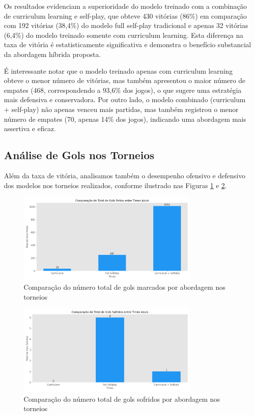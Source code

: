Os resultados evidenciam a superioridade do modelo treinado com a combinação de curriculum learning e self-play, que obteve 430 vitórias (86\%) em comparação com 192 vitórias (38,4\%) do modelo full self-play tradicional e apenas 32 vitórias (6,4\%) do modelo treinado somente com curriculum learning. Esta diferença na taxa de vitória é estatisticamente significativa e demonstra o benefício substancial da abordagem híbrida proposta.

É interessante notar que o modelo treinado apenas com curriculum learning obteve o menor número de vitórias, mas também apresentou o maior número de empates (468, correspondendo a 93,6\% dos jogos), o que sugere uma estratégia mais defensiva e conservadora. Por outro lado, o modelo combinado (curriculum + self-play) não apenas venceu mais partidas, mas também registrou o menor número de empates (70, apenas 14\% dos jogos), indicando uma abordagem mais assertiva e eficaz.

\subsection{Análise de Gols nos Torneios}

Além da taxa de vitória, analisamos também o desempenho ofensivo e defensivo dos modelos nos torneios realizados, conforme ilustrado nas Figuras \ref{fig:comparacao_gols_feitos} e \ref{fig:comparacao_gols_sofridos}.

\begin{figure}[H]
    \centering
    \includegraphics[width=0.8\textwidth]{fig/graficos_trabalho/graficos_torneios/geral/comparacao_gols_feitos.png}
    \caption{Comparação do número total de gols marcados por abordagem nos torneios}
    \label{fig:comparacao_gols_feitos}
\end{figure}

\begin{figure}[H]
    \centering
    \includegraphics[width=0.8\textwidth]{fig/graficos_trabalho/graficos_torneios/geral/comparacao_gols_sofridos.png}
    \caption{Comparação do número total de gols sofridos por abordagem nos torneios}
    \label{fig:comparacao_gols_sofridos}
\end{figure}

